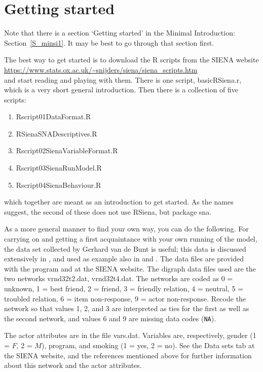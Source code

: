 \documentclass[a4paper,fleqn,11pt]{article}
\newcommand{\+}{\, + \,}
\newcommand{\sfn}[1]{\textsf{#1}}
\newcommand{\R}{{\sf R }}
\newcommand{\rs}{{\sf RSiena}}
\newcommand{\SI}{{\sf SIENA }}
\begin{document}
\newpage
\section{Getting started}
\label{S_getting}

Note that there is a section `Getting started' in the Minimal
Introduction: Section~\ref{S_minsi1}. It may be best
to go through that section first.

The best way to get started is to download the \R scripts from the
\SI website \\
\url{https://www.stats.ox.ac.uk/~snijders/siena/siena_scripts.htm} \\
and start reading and playing with them.
There is one script, \textsf{basicRSiena.r}, which is a very short
general introduction. Then there is a collection of five scripts:
\begin{enumerate}
  \item \textsf{Rscript01DataFormat.R}
  \item \textsf{RSienaSNADescriptives.R}
  \item \textsf{Rscript02SienaVariableFormat.R}
  \item \textsf{Rscript03SienaRunModel.R}
  \item \textsf{Rscript04SienaBehaviour.R}
\end{enumerate}
which together are meant as an introduction to get started.
As the names suggest, the second of these does not use \rs,
but package \textsf{sna}.
\bigskip

As a more general manner to find your own way,
you can do the following.
For carrying on and getting a first acquaintance with your own running
of the model, the data set collected by Gerhard van de Bunt
is useful; this data is discussed extensively in
\citet*{vanBunt99, vanBuntEA99},
and used as example also in \citet{Snijders01} and \citet{Snijders05}.
The data files are provided with the program
and at the \SI website. The digraph data files
used are the two networks {\sf vrnd32t2.dat}, {\sf vrnd32t4.dat}.
The networks are coded as 0 = unknown, 1 = best friend, 2 = friend,
3 = friendly relation, 4 = neutral, 5 = troubled relation, 6 = item
non-response, 9 = actor non-response.
Recode the network so that values 1, 2, and 3 are interpreted
as ties for the first as well as the second network, and values 6 and 9
are missing data codes (\texttt{NA}).

The actor attributes are in the file {\sf vars.dat}. Variables
are, respectively, gender (1 = $F$, 2 = $M$), program, and smoking
(1 = yes, 2 = no). See the \sfn{Data sets} tab at the
\SI website, and the references mentioned above for further
information about this network and the actor attributes.
\end{document}

